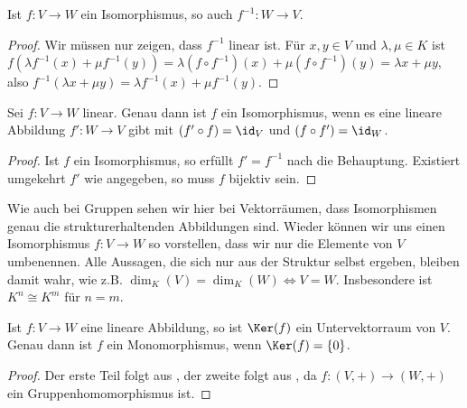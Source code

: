 \begin{lemma}
	Ist $f:V\to W$ ein Isomorphismus, so auch $f^{-1}:W\to V$.
\end{lemma}
\begin{proof}
	Wir müssen nur zeigen, dass $f^{-1}$ linear ist. Für $x,y\in V$ und $\lambda,\mu\in K$ ist $f(\lambda f^{-1}(x) + 
	\mu f^{-1}(y))=\lambda (f\circ f^{-1})(x) + \mu (f\circ f^{-1})(y)=\lambda x + \mu y$, also $f^{-1}(\lambda x + 
	\mu y)=\lambda f^{-1}(x) + \mu f^{-1}(y)$.
\end{proof}

\begin{proposition}
	Sei $f:V\to W$ linear. Genau dann ist $f$ ein Isomorphismus, wenn es eine lineare Abbildung $f':W
	\to V$ gibt mit $(f'\circ f)=\id_V$ und $(f\circ f')=\id_W$.
\end{proposition}
\begin{proof}
	Ist $f$ ein Isomorphismus, so erfüllt $f'=f^{-1}$ nach  die Behauptung. Existiert umgekehrt $f'$ wie angegeben, so muss 
	$f$ bijektiv sein.
\end{proof}

\begin{remark}
	Wie auch bei Gruppen sehen wir hier bei Vektorräumen, dass Isomorphismen genau die strukturerhaltenden 
	Abbildungen sind. Wieder können wir uns einen Isomorphismus $f:V\to W$ so vorstellen, dass wir nur die Elemente von 
	$V$ umbenennen. Alle Aussagen, die sich nur aus der Struktur selbst ergeben, bleiben damit wahr, wie z.B. $\dim_K(V)=
	\dim_K(W)\iff V=W$. Insbesondere ist $K^n \cong K^m$ für $n=m$.
\end{remark}

\begin{proposition}
	Ist $f:V\to W$ eine lineare Abbildung, so ist $\Ker(f)$ ein Untervektorraum von $V$. Genau dann ist $f$ ein 
	Monomorphismus, wenn $\Ker(f)=\{0\}$.
\end{proposition}
\begin{proof}
	Der erste Teil folgt aus , der zweite folgt aus , da $f:(V,+)\to (W,+)$ ein 
	Gruppenhomomorphismus ist.
\end{proof}